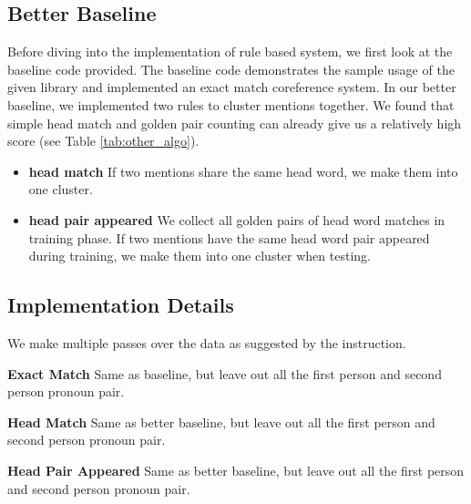 \documentclass[letterpaper]{article}
\begin{document}
\subsection{Better Baseline}
Before diving into the implementation of rule based system, we first look at the baseline code provided. The baseline code demonstrates the sample usage of the given library and implemented an exact match coreference system. In our better baseline, we implemented two rules to cluster mentions together. We found that simple head match and golden pair counting can already give us a relatively high score (see Table \ref{tab:other_algo}).

\begin{itemize}
\item \textbf{head match}
If two mentions share the same head word, we make them into one cluster.
\item \textbf{head pair appeared}
We collect all golden pairs of head word matches in training phase.
If two mentions have the same head word pair appeared during training, we make them into one cluster when testing.
\end{itemize}

\subsection{Implementation Details}

We make multiple passes over the data as suggested by the instruction.

\vspace{0.1cm}

\textbf{Exact Match}
Same as baseline, but leave out all the first person and second person pronoun pair.

\vspace{0.1cm}

\textbf{Head Match}
Same as better baseline, but leave out all the first person and second person pronoun pair.

\vspace{0.1cm}

\textbf{Head Pair Appeared}
Same as better baseline, but leave out all the first person and second person pronoun pair.

\vspace{0.1cm}
\end{document}
